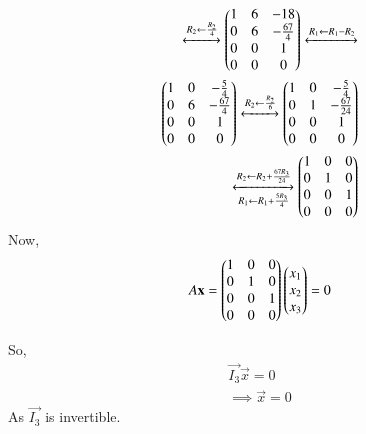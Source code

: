 \documentclass[journal,12pt,twocolumn]{IEEEtran}
\renewcommand\thesection{\arabic{section}}
\begin{document}
\begin{align}
\xleftrightarrow[]{R_2\leftarrow \frac{R_2}{4}}
\begin{pmatrix}1 & 6 & -18\\0 & 6 & -\frac{67}{4}\\0 & 0 & 1\\0 & 0 & 0\end{pmatrix}\xleftrightarrow[]{R_1\leftarrow R_1-R_2}\\
\begin{pmatrix}1 & 0 & -\frac{5}{4}\\0 & 6 & -\frac{67}{4}\\0 & 0 & 1\\0 & 0 & 0\end{pmatrix}\xleftrightarrow[]{R_2\leftarrow \frac{R_2}{6}}
\begin{pmatrix}1 & 0 & -\frac{5}{4}\\0 & 1 & -\frac{67}{24}\\0 & 0 & 1\\0 & 0 & 0\end{pmatrix}\\
\xleftrightarrow[R_1\leftarrow R_1+\frac{5R_3}{4}]{R_2\leftarrow R_2+\frac{67R_3}{24}}
\begin{pmatrix}1 & 0 & 0\\0 & 1 & 0\\0 & 0 & 1\\0 & 0 & 0\end{pmatrix}
\end{align}
Now,
\begin{align}
A\mathbf{x} = \begin{pmatrix}1 & 0 & 0\\0 & 1 & 0\\0 & 0 & 1\\0 & 0 & 0\end{pmatrix}\begin{pmatrix}x_1\\x_2\\x_3\end{pmatrix} = 0
\end{align}


So,
\begin{align}
\vec{I_3} \vec{x} = 0\\
\implies \vec{x} = 0
\end{align}
As $\vec{I_3}$ is invertible.
\end{document}
